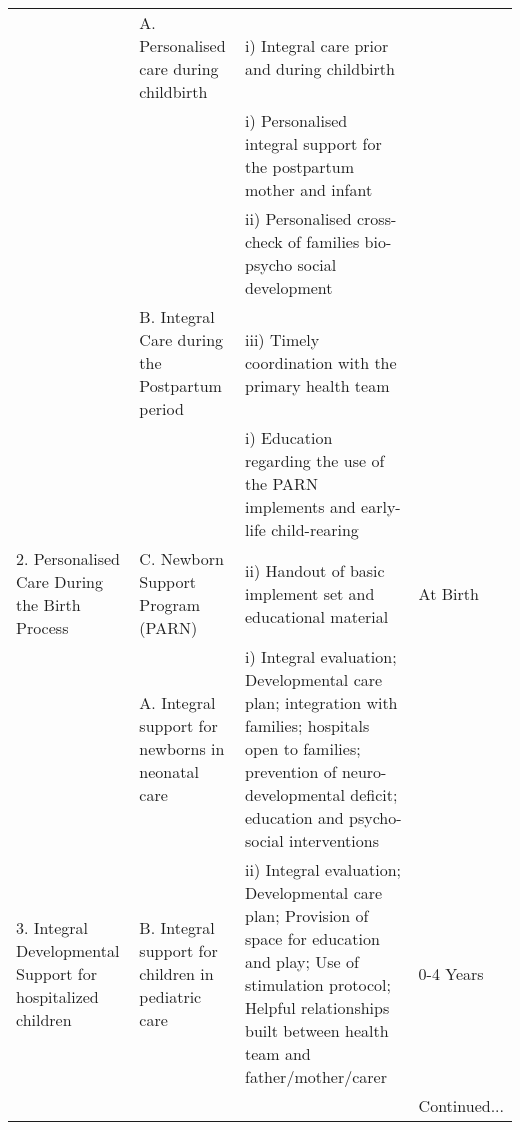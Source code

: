 \documentclass[12pt]{article}
\begin{document}
\begin{spacing}{1.4}
\begin{landscape}
\begin{table}[htpb!]
\begin{tabular}{p{4.5cm}p{5cm}p{10cm}p{2.5cm}}
&\multirow{1}{5cm}{A. Personalised care during childbirth}&\cellcolor{dccol}i) Integral care prior and during childbirth  & \\
&\cellcolor{dccol}    &i) Personalised integral support for the postpartum mother and infant & \\
&\cellcolor{dccol}&\cellcolor{dccol}ii) Personalised cross-check of families bio-psycho social development&\\
&\multirow{-5}{5cm}{\cellcolor{dccol}B. Integral Care during the Postpartum period} &iii) Timely coordination with the primary health team & \\
& &i) \cellcolor{dccol}Education regarding the use of the PARN implements and early-life child-rearing  &\\
\multirow{-6}{4.5cm}{2. Personalised Care During the Birth Process}              &\multirow{-2}{5cm}{C. Newborn Support Program (PARN)}&ii) Handout of basic implement set and educational material &\multirow{-6}{2.5cm}{At Birth}\\ \midrule
\cellcolor{dccol}&\vspace{2mm}\cellcolor{dccol}A. Integral support for newborns in neonatal care &\cellcolor{dccol} i) Integral evaluation; Developmental care plan; integration with families; hospitals open to families; prevention of neuro-developmental deficit; education and psycho-social interventions&\cellcolor{dccol} \\
\multirow{-2}{4.5cm}{\cellcolor{dccol}3. Integral Developmental Support for hospitalized children}&\vspace{2mm}B. Integral support for children in pediatric care&ii) Integral evaluation; Developmental care plan; Provision of space for education and play; Use of stimulation protocol; Helpful relationships built between  health team and father/mother/carer &\multirow{-2}{2.5cm}{\cellcolor{dccol} 0-4 Years}\\ \midrule
&&& Continued...
  \end{tabular}
\end{table}
\end{landscape}


\end{spacing}
\end{document}
